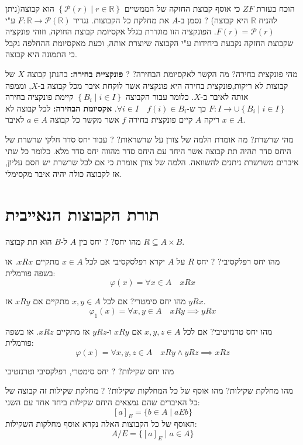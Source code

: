 \documentclass{tstextbook}
\begin{document}
הוכח בעזרת \(ZF\) כי אוסף קבוצת החזקה של הממשיים \(\left\{  \mathcal{P}(r)\mid r \in \mathbb{R}  \right\}\) הוא קבוצה(ניתן להניח \(\mathbb{R}\) היא קבוצה)
?
נסמן ב-\(A\) את מחלקת כל הקבוצות. נגדיר \(F:\mathbb{R}\to \mathcal{P}\left( \mathbb{R} \right)\) ע"י \(F(r)=\mathcal{P}(r)\). הפונקציה הזו מוגדרת בגלל אקסיומת קבוצת החזקה, וזוהי פונקציה שקבוצת החזקה נקבעת ביחידות ע"י הקבוצה שיוצרת אותה, וכעת מאקסיומת ההחלפה נקבל כי התמונה היא קבוצה.

מהי פונקצית בחירה? מה הקשר לאקסיומת הבחירה?
?
\textbf{פונקציית בחירה:} בהנתן קבוצה \(X\) של קבוצות לא ריקות,פונקצית בחירה היא פונקציה אשר לוקחת איבר מכל קבוצה ב-\(X\), וממפה אותה לאיבר ב-\(X\). כלומר עבור הקבוצה \(\left\{  B_{i}\mid i \in I  \right\}\) קיימת פונקציה בחירה \(F:I\to \cup \left\{  B_{i}\mid i \in I  \right\}\) כך ש-\(\forall i \in I\quad f(i) \in B_{i}\).
\textbf{אקסיומת הבחירה:} לכל קבוצה לא ריקה \(A\) קיים פונקצית בחירה \(f\) אשר מקשר כל קבוצה \(a \in A\) לאיבר \(x \in A\).

מהי שרשרת? מה אומרת הלמה של צורן על שרשראות?
?
עבור יחס סדר חלקי שרשרת של היחס סדר תהיה תת קבוצה אשר היחד עם היחס סדר מהווה יחס סדר מלא. כלומר כל שתי איברים משרשרת ניתנים להשוואה. הלמה של צורן אומרת כי אם לכל שרשרת יש חסם עליון, אז לקבוצה כולה יהיה איבר מקסימלי.

\section{תורת הקבוצות הנאייבית}

מהו יחס?
?
יחס בין \(A\) ל-\(B\) הוא תת קבוצה \(R\subseteq A\times B\).

מהו יחס רפלקסיבי?
?
יחס \(R\) על \(A\) יקרא רפלסקסיבי אם לכל \(x \in A\) מתקיים \(xRx\). או בשפה פורמלית:
$$\varphi(x)=\forall x \in A\quad xRx$$

מהו יחס סימטרי?
אם לכל \(x,y \in A\) מתקיים אם \(xRy\) אז \(yRx\).
$$\varphi_{1}(x)=\forall x,y \in A\quad xRy\implies yRx$$

מהו יחס טרנזיטיבי?
אם לכל \(x,y,z \in A\) אם \(xRy\) ו-\(yRz\) אז מתקיים \(xRz\). או בשפה פורמלית:
$$\varphi(x)=\forall x,y,z \in A\quad xRy\land yRz\implies xRz$$

מהו יחס שקילות?
?
יחס סימטרי, רפלקסיבי וטרנזטיבי

מהו מחלקת שקילות? מהו אוסף של כל המחלקות שקילות?
?
מחלקת שקילות זה קבוצה של כל האיברים שהם נמצאים היחס שקילות ביחד אחד עם השני:
$$[a]_{E}=\{b\in A\mid a E b\}$$
האוסף של כל הקבוצות האלה נקרא אוסף מחלקות השקילות: $$A/E=\{[a]_{E}\mid a\in A\}$$
\end{document}
